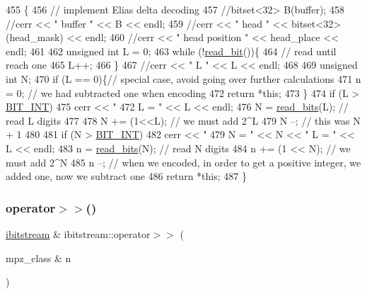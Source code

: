 \begin{DoxyCode}
455                                                    \{
456   \textcolor{comment}{// implement Elias delta decoding}
457   \textcolor{comment}{//bitset<32> B(buffer);}
458   \textcolor{comment}{//cerr << " buffer " << B << endl;}
459   \textcolor{comment}{//cerr << " head " << bitset<32>(head\_mask) << endl;}
460   \textcolor{comment}{//cerr << " head position " << head\_place << endl;}
461   
462   \textcolor{keywordtype}{unsigned} \textcolor{keywordtype}{int} L = 0;
463   \textcolor{keywordflow}{while} (!\hyperlink{classibitstream_a895239acf7179f6778388c39c97643e4}{read\_bit}())\{
464     \textcolor{comment}{// read until reach one}
465     L++;
466   \}
467   \textcolor{comment}{//cerr << " L " << L << endl;}
468   
469   \textcolor{keywordtype}{unsigned} \textcolor{keywordtype}{int} N;
470   \textcolor{keywordflow}{if} (L == 0)\{\textcolor{comment}{// special case, avoid going over further calculations}
471     n = 0; \textcolor{comment}{// we had subtracted one when encoding }
472     \textcolor{keywordflow}{return} *\textcolor{keyword}{this};
473   \}
474   \textcolor{keywordflow}{if} (L > \hyperlink{bitstream_8h_afcadf5aa65c5159bfb96c4d82ebc0a5d}{BIT\_INT})
475     cerr << \textcolor{stringliteral}{" 472 L = "} << L << endl;
476   N = \hyperlink{classibitstream_a2fdcaecf10fefa6942dcd5286a2696e0}{read\_bits}(L); \textcolor{comment}{// read L digits}
477   
478   N += (1<<L); \textcolor{comment}{// we must add 2^L}
479   N --; \textcolor{comment}{// this was N + 1}
480 
481   \textcolor{keywordflow}{if} (N > \hyperlink{bitstream_8h_afcadf5aa65c5159bfb96c4d82ebc0a5d}{BIT\_INT})
482     cerr << \textcolor{stringliteral}{" 479 N = "} << N << \textcolor{stringliteral}{" L = "} << L << endl;
483   n = \hyperlink{classibitstream_a2fdcaecf10fefa6942dcd5286a2696e0}{read\_bits}(N); \textcolor{comment}{// read N digits}
484   n += (1 << N); \textcolor{comment}{// we must add 2^N}
485   n --; \textcolor{comment}{// when we encoded, in order to get a positive integer, we added one, now we subtract one}
486   \textcolor{keywordflow}{return} *\textcolor{keyword}{this};
487 \}
\end{DoxyCode}
\mbox{\label{classibitstream_a0264d01fa1211c4bb73f5de2bc68adbc}} 
\subsubsection{\texorpdfstring{operator$>$$>$()}{operator>>()}\hspace{0.1cm}{\footnotesize\ttfamily [2/2]}}
{\footnotesize\ttfamily \hyperlink{classibitstream}{ibitstream} \& ibitstream\+::operator$>$$>$ (\begin{DoxyParamCaption}\item[{mpz\+\_\+class \&}]{n }\end{DoxyParamCaption})}



